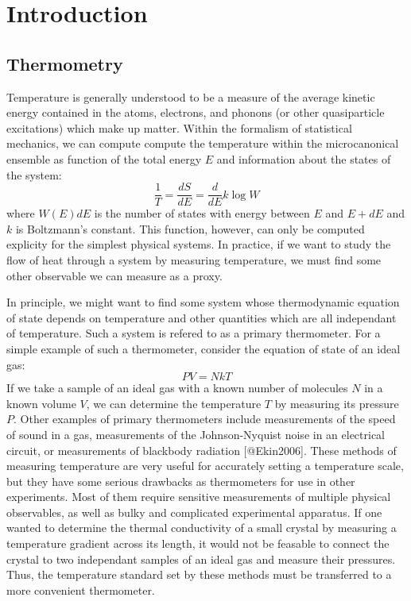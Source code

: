\hypertarget{introduction}{%
\section{Introduction}\label{introduction}}

\hypertarget{thermometry}{%
\subsection{Thermometry}\label{thermometry}}

Temperature is generally understood to be a measure of the average
kinetic energy contained in the atoms, electrons, and phonons (or other
quasiparticle excitations) which make up matter. Within the formalism of
statistical mechanics, we can compute compute the temperature within the
microcanonical ensemble as function of the total energy \(E\) and
information about the states of the system:
\[\frac{1}{T} = \frac{dS}{dE} = \frac{d}{dE} k \log W\] where \(W(E)dE\)
is the number of states with energy between \(E\) and \(E+dE\) and \(k\)
is Boltzmann's constant. This function, however, can only be computed
explicity for the simplest physical systems. In practice, if we want to
study the flow of heat through a system by measuring temperature, we
must find some other observable we can measure as a proxy.

In principle, we might want to find some system whose thermodynamic
equation of state depends on temperature and other quantities which are
all independant of temperature. Such a system is refered to as a primary
thermometer. For a simple example of such a thermometer, consider the
equation of state of an ideal gas: \[PV = NkT\] If we take a sample of
an ideal gas with a known number of molecules \(N\) in a known volume
\(V\), we can determine the temperature \(T\) by measuring its pressure
\(P\). Other examples of primary thermometers include measurements of
the speed of sound in a gas, measurements of the Johnson-Nyquist noise
in an electrical circuit, or measurements of blackbody radiation
{[}@Ekin2006{]}. These methods of measuring temperature are very useful
for accurately setting a temperature scale, but they have some serious
drawbacks as thermometers for use in other experiments. Most of them
require sensitive measurements of multiple physical observables, as well
as bulky and complicated experimental apparatus. If one wanted to
determine the thermal conductivity of a small crystal by measuring a
temperature gradient across its length, it would not be feasable to
connect the crystal to two independant samples of an ideal gas and
measure their pressures. Thus, the temperature standard set by these
methods must be transferred to a more convenient thermometer.

